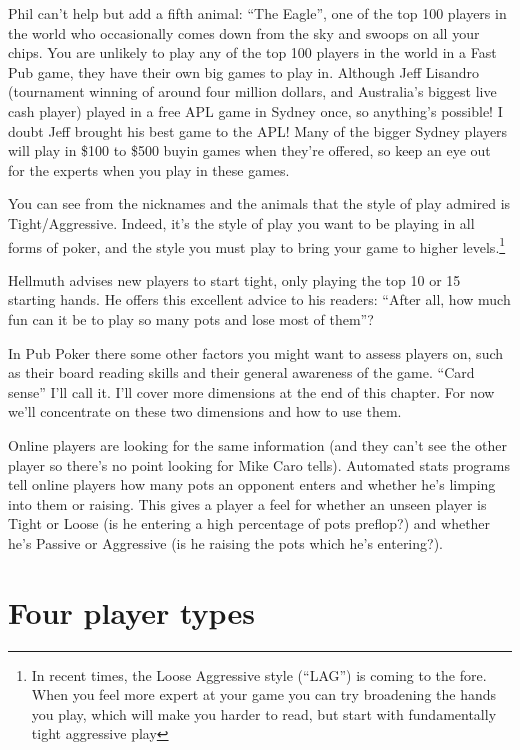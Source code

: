 Phil can't help but add a fifth animal: ``The Eagle'', one of the
top 100 players in the world who occasionally comes down from
the sky and swoops on all your chips. You are unlikely to play
any of the top 100 players in the world in a Fast Pub game, they
have their own big games to play in. Although Jeff Lisandro
(tournament winning of around four million dollars, and
Australia's biggest live cash player) played in
a free APL game in Sydney once, so anything's possible! I doubt
Jeff brought his best game to the APL! Many
of the bigger Sydney players will play in \$100 to \$500 buyin
games when they're offered, so keep an eye out for the experts
when you play in these games.

You can see from the nicknames and the animals that the style
of play admired is Tight/Aggressive. Indeed,
it's the style of play you want to be playing in all forms of
poker, and the style you must play to bring your game to higher
levels.\footnote{In recent times, the Loose Aggressive style
(``LAG'') is coming to the fore. When you feel more expert
at your game you can try broadening the hands you play, which
will make you harder to read, but start with fundamentally
tight aggressive play}

Hellmuth advises new players to start tight, only playing the
top 10 or 15 starting hands. He offers this excellent
advice to his readers: ``After all, how much fun can it be to
play so many pots and lose most of them''?

In Pub Poker there some other factors you might want to assess
players on, such as their board reading skills and their general
awareness of the game. ``Card sense'' I'll call it.  I'll cover more
dimensions at the end of this chapter. For now we'll concentrate on these
two dimensions and how to use them.

Online players are looking for the same information (and they
can't see the other player so there's no point looking for Mike Caro
tells). Automated stats programs tell online players how many pots an
opponent enters and whether he's limping into them or raising. This
gives a player a feel for whether an unseen player is Tight or Loose
(is he entering a high percentage of pots preflop?) and whether he's
Passive or Aggressive (is he raising the pots which he's entering?).


\section{Four player types}

